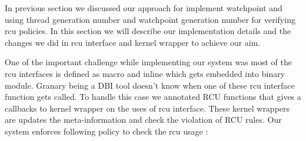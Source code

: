 In previous section we discussed our approach for implement watchpoint and using thread generation number and watchpoint generation number for verifying rcu policies. In this section we will describe our implementation details and the changes we did in rcu interface and kernel wrapper to achieve our aim. 

One of the important challenge while implementing our system was most of the rcu interfaces is defined as macro and inline which gets embedded into binary module. Granary being a DBI tool doesn’t know when one of these rcu interface function gets called. To handle this case we annotated RCU functions that gives a callbacks to kernel wrapper on the uses of rcu interface. These kernel wrappers are updates the meta-information and check the violation of RCU rules. Our system enforces following policy to check the rcu usage : 

